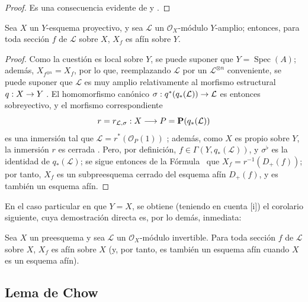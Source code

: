 \documentclass[oneside,10pt]{amsart}
\makeatletter
\newcommand{\ega@arrow}[2]{\mathchoice{#1}{#2}{#2}{#2}}
\renewcommand{\to}{\ega@arrow{\longrightarrow}{\rightarrow}}
\newcommand{\oldpage}[2][]{\marginnote{\normalfont\footnotesize\textbf{#1}~|~#2}\ignorespaces}
\let\EGAOriginalLabel\label
\renewcommand{\label}[1]{\phantomsection\EGAOriginalLabel{#1}}
\makeatother
\begin{document}
\begin{proof}
Es una consecuencia evidente de  y .
\end{proof}

\begin{proposition}[5.5.7]
\label{II.5.5.7-fr}
Sea $X$ un $Y$-esquema proyectivo, y sea $\mathcal{L}$ un $\mathcal{O}_X$-módulo $Y$-amplio; entonces, para toda sección $f$ de $\mathcal{L}$ sobre $X$, $X_f$ es afín sobre $Y$.
\end{proposition}

\oldpage[II]{106}
\begin{proof}
Como la cuestión es local sobre $Y$, se puede suponer que $Y=\operatorname{Spec}(A)$; además, $X_{f^{\otimes n}}=X_f$, por lo que, reemplazando $\mathcal{L}$ por un $\mathcal{L}^{\otimes n}$ conveniente, se puede suponer que $\mathcal{L}$ es muy amplio relativamente al morfismo estructural $q:X\to Y$ .
El homomorfismo canónico $\sigma:q^*(q_*(\mathcal{L}))\to\mathcal{L}$ es entonces sobreyectivo, y el morfismo correspondiente
\[
r=r_{\mathcal{L},\sigma}:X\to P=\mathbf{P}(q_*(\mathcal{L}))
\]
es una inmersión tal que $\mathcal{L}=r^*(\mathcal{O}_P(1))$ ; además, como $X$ es propio sobre $Y$, la inmersión $r$ es cerrada .
Pero, por definición, $f\in\Gamma(Y,q_*(\mathcal{L}))$, y $\sigma^\flat$ es la identidad de $q_*(\mathcal{L})$; se sigue entonces de la Fórmula~ que $X_f=r^{-1}(D_+(f))$;
por tanto, $X_f$ es un subpreesquema cerrado del esquema afín $D_+(f)$, y es también un esquema afín.
\end{proof}

En el caso particular en que $Y=X$, se obtiene (teniendo en cuenta [i]) el corolario siguiente, cuya demostración directa es, por lo demás, inmediata:
\begin{corollary}[5.5.8]
\label{II.5.5.8-fr}
Sea $X$ un preesquema y sea $\mathcal{L}$ un $\mathcal{O}_X$-módulo invertible.
Para toda sección $f$ de $\mathcal{L}$ sobre $X$, $X_f$ es afín sobre $X$ (y, por tanto, es también un esquema afín cuando $X$ es un esquema afín).
\end{corollary}

\subsection{Lema de Chow}
\label{subsection:II.5.6-fr}
\end{document}
